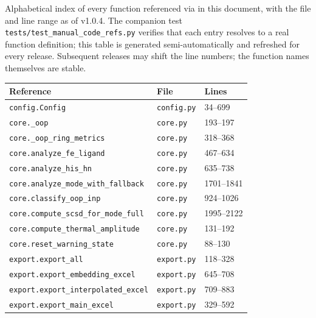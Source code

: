 \documentclass[10pt,a4paper,twoside]{article}
\newcommand{\codref}[1]{%
  \quad\text{\textcolor{gray!70!black}{\footnotesize $\rightsquigarrow$~\texttt{#1}}}}
\newcommand{\fn}[1]{\texttt{#1}}
\begin{document}
Alphabetical index of every function referenced via \codref{} in
this document, with the file and line range as of v1.0.4. The
companion test \fn{tests/test\_manual\_code\_refs.py} verifies
that each entry resolves to a real function definition; this
table is generated semi-automatically and refreshed for every
release. Subsequent releases may shift the line numbers; the
function names themselves are stable.

\begin{longtable}{p{} p{} p{}}
\toprule
\textbf{Reference} & \textbf{File} & \textbf{Lines} \\
\midrule
\texttt{config.Config}                                & \texttt{config.py}         & 34--699   \\
\texttt{core.\_oop}                                   & \texttt{core.py}           & 193--197  \\
\texttt{core.\_oop\_ring\_metrics}                    & \texttt{core.py}           & 318--368  \\
\texttt{core.analyze\_fe\_ligand}                     & \texttt{core.py}           & 467--634  \\
\texttt{core.analyze\_his\_hn}                        & \texttt{core.py}           & 635--738  \\
\texttt{core.analyze\_mode\_with\_fallback}           & \texttt{core.py}           & 1701--1841 \\
\texttt{core.classify\_oop\_inp}                      & \texttt{core.py}           & 924--1026 \\
\texttt{core.compute\_scsd\_for\_mode\_full}          & \texttt{core.py}           & 1995--2122 \\
\texttt{core.compute\_thermal\_amplitude}             & \texttt{core.py}           & 131--192  \\
\texttt{core.reset\_warning\_state}                   & \texttt{core.py}           & 88--130   \\
\texttt{export.export\_all}                           & \texttt{export.py}         & 118--328  \\
\texttt{export.export\_embedding\_excel}              & \texttt{export.py}         & 645--708  \\
\texttt{export.export\_interpolated\_excel}           & \texttt{export.py}         & 709--883  \\
\texttt{export.export\_main\_excel}                   & \texttt{export.py}         & 329--592  \\

\end{longtable}
\end{document}
